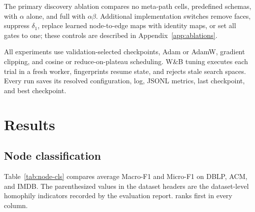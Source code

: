 The primary discovery ablation compares no meta-path cells, predefined schemas, \ampss{} with
$\alpha$ alone, and full \ampss{} with $\alpha\beta$. Additional implementation switches remove
faces, suppress $\delta_1$, replace learned node-to-edge maps with identity maps, or set all gates
to one; these controls are described in Appendix~\ref{app:ablations}.

All experiments use validation-selected checkpoints, Adam or AdamW, gradient clipping, and cosine
or reduce-on-plateau scheduling. W\&B tuning executes each trial in a fresh worker, fingerprints
resume state, and rejects stale search spaces. Every run saves its resolved configuration, log,
JSONL metrics, last checkpoint, and best checkpoint.

\section{Results}
\label{sec:results}

\subsection{Node classification}

Table~\ref{tab:node-cls} compares average Macro-F1 and Micro-F1 on DBLP, ACM, and IMDB. The
parenthesized values in the dataset headers are the dataset-level homophily indicators recorded by
the evaluation report. \method{} ranks first in every column.

